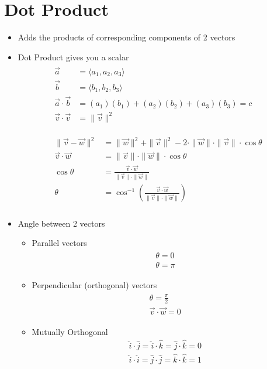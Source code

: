 \documentclass{article}
\begin{document}
\section{Dot Product}
\begin{itemize}
  \item Adds the products of corresponding components of 2 vectors
  \item Dot Product gives you a scalar
  \begin{align}
    \begin{split}
      \vec{a} &= \langle a_1, a_2, a_3 \rangle \\
      \vec{b} &= \langle b_1, b_2, b_3 \rangle \\
      \vec{a}\cdot\vec{b} &= (a_1)(b_1) + (a_2)(b_2) + (a_3)(b_3) = c \\
      \vec{v}\cdot\vec{v} &= \|\vec{v}\|^2 \\
    \end{split} \\
    \begin{split} \\
      \|\vec{v} - \vec{w}\|^2 &= \|\vec{w}\|^2 + \|\vec{v}\|^2 - 2\cdot\|\vec{w}\|\cdot\|\vec{v}\|\cdot\cos\theta \\
      \vec{v}\cdot\vec{w} &= \|\vec{v}\|\cdot\|\vec{w}\|\cdot\cos\theta \\
      \cos\theta &= \frac{\vec{v}\cdot\vec{w}}{\|\vec{v}\|\cdot\|\vec{w}\|} \\
      \theta &= \cos^{-1} \left( \frac{\vec{v}\cdot\vec{w}}{\|\vec{v}\|\cdot\|\vec{w}\|} \right) \\
    \end{split}
  \end{align}

  \item Angle between 2 vectors
  \begin{itemize}
    \item Parallel vectors
    \begin{align}
      \begin{split}
        \theta = 0 \\
        \theta = \pi
      \end{split}
    \end{align}
    \item Perpendicular (orthogonal) vectors
      \begin{align}
        \begin{split}
          \theta = \frac{\pi}{2} \\
          \vec{v}\cdot\vec{w} = 0
        \end{split}
      \end{align}
    \item Mutually Orthogonal
    \begin{align}
      \hat{i}\cdot\hat{j} = \hat{i}\cdot\hat{k} = \hat{j}\cdot\hat{k} = 0 \\
      \hat{i}\cdot\hat{i} = \hat{j}\cdot\hat{j} = \hat{k}\cdot\hat{k} = 1
    \end{align}
  \end{itemize}


\end{itemize}
\end{document}
